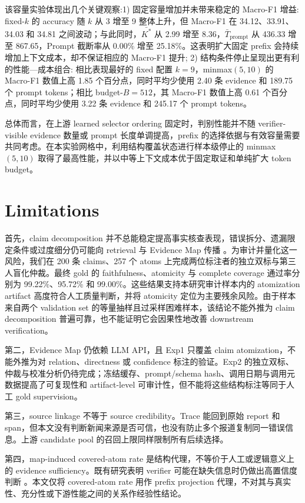 \documentclass[letterpaper]{article}
\begin{document}
该容量实验体现出几个关键观察:1) 固定容量增加并未带来稳定的 Macro-F1 增益: fixed-$k$ 的 accuracy 随 $k$ 从 3 增至 9 整体上升，但 Macro-F1 在 34.12、33.91、34.03 和 34.81 之间波动；与此同时，$\bar{K^\ast}$ 从 2.99 增至 8.36，$\bar{T}_{\mathrm{prompt}}$ 从 436.33 增至 867.65，Prompt 截断率从 0.00\% 增至 25.18\%。这表明扩大固定 prefix 会持续增加上下文成本，却不保证相应的 Macro-F1 提升; 2) 结构条件停止呈现出更有利的性能—成本组合: 相比表现最好的 fixed 配置 $k{=}9$，minmax$(5,10)$ 的 Macro-F1 数值上高 1.85 个百分点，同时平均少使用 2.40 条 evidence 和 189.75 个 prompt tokens；相比 budget-$B{=}512$，其 Macro-F1 数值上高 0.61 个百分点，同时平均少使用 3.22 条 evidence 和 245.17 个 prompt tokens。

总体而言，在上游 learned selector ordering 固定时，判别性能并不随 verifier-visible evidence 数量或 prompt 长度单调提高，prefix 的选择依据与有效容量需要共同考虑。在本实验网格中，利用结构覆盖状态进行样本级停止的 minmax$(5,10)$ 取得了最高性能，并以中等上下文成本优于固定取证和单纯扩大 token budget。

\FloatBarrier
\section{Limitations}

首先，claim decomposition 并不总能稳定提高事实核查表现，错误拆分、遗漏限定条件或过度细分仍可能向 retrieval 与 Evidence Map 传播 \citep{Hu2025DecompositionDilemmas}。为审计并量化这一风险，我们在 200 条 claims、257 个 atoms 上完成两位标注者的独立双标与第三人盲化仲裁。最终 gold 的 faithfulness、atomicity 与 complete coverage 通过率分别为 99.22\%、95.72\% 和 99.00\%。这些结果支持本研究审计样本内的 atomization artifact 高度符合人工质量判断，并将 atomicity 定位为主要残余风险。由于样本来自两个 validation set 的等量抽样且过采样困难样本，该结论不能外推为 claim decomposition 普遍可靠，也不能证明它会因果性地改善 downstream verification。

第二，Evidence Map 仍依赖 LLM API，且 Exp1 只覆盖 claim atomization，不能外推为对 relation、directness 或 confidence 标注的验证。Exp2 的独立双标、仲裁与校准分析仍待完成；冻结缓存、prompt/schema hash、调用日期与调用元数据提高了可复现性和 artifact-level 可审计性，但不能将这些结构标注等同于人工 gold supervision。

第三，source linkage 不等于 source credibility。Trace 能回到原始 report 和 span，但本文没有判断新闻来源是否可信，也没有防止多个报道复制同一错误信息。上游 candidate pool 的召回上限同样限制所有后续选择。

第四，map-induced covered-atom rate 是结构代理，不等价于人工或逻辑意义上的 evidence sufficiency。既有研究表明 verifier 可能在缺失信息时仍做出高置信度判断 \citep{Atanasova2022Insufficient}。本文仅将 covered-atom rate 用作 prefix projection 代理，不对其与真实性、充分性或下游性能之间的关系作经验性结论。
\end{document}
